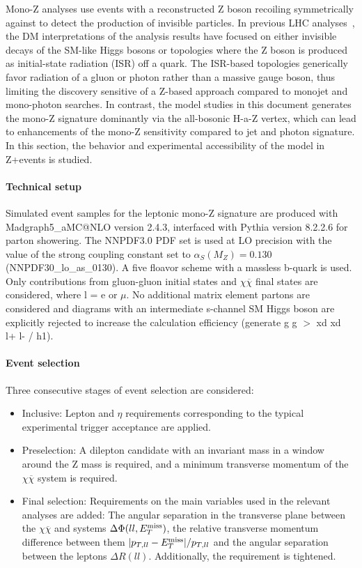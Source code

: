 Mono-Z analyses use events with a reconstructed Z boson recoiling symmetrically against \MET to detect the production of invisible particles.
In previous LHC analyses~\cite{Aaboud:2017bja,Sirunyan:2017qfc}, the DM interpretations of the analysis results have focused on either invisible decays of the SM-like Higgs bosons or topologies where the Z boson is produced as initial-state radiation (ISR) off a quark. The ISR-based topologies generically favor radiation of a gluon or photon rather than a massive gauge boson, thus limiting the discovery sensitive of a Z-based approach compared to monojet and mono-photon searches. In contrast, the model studies in this document generates the mono-Z signature dominantly via the all-bosonic H-a-Z vertex, which can lead to enhancements of the mono-Z sensitivity compared to jet and photon signature. In this section, the behavior and experimental accessibility of the model in Z+\MET events is studied.

\paragraph{Technical setup}
Simulated event samples for the leptonic mono-Z signature are produced with Madgraph5\_aMC@NLO version 2.4.3, interfaced with Pythia version 8.2.2.6 for parton showering. The NNPDF3.0 PDF set is used at LO precision with the value of the strong coupling constant set to $\alpha_{S}(M_{Z}) = 0.130$ (NNPDF30\_lo\_as\_0130). A five floavor scheme with a massless b-quark is used.  Only contributions from gluon-gluon initial states and \lp\lm$\chi\overline{\chi}$ final states are considered, where l = e or $\mu$. No additional matrix element partons are considered and diagrams with an intermediate s-channel SM Higgs boson are explicitly rejected to increase the calculation efficiency (generate g g $>$ xd xd~ l+ l- / h1). 


\paragraph{Event selection}
Three consecutive stages of event selection are considered:
\begin{itemize}
\item Inclusive: Lepton \pt and $\eta$ requirements corresponding to the typical experimental trigger acceptance are applied.

\item Preselection: A dilepton candidate with an invariant mass in a window around the Z mass is required, and a minimum transverse momentum of the $\chi\overline{\chi}$ system is required.

\item Final selection: Requirements on the main variables used in the relevant analyses are added: The angular separation in the transverse plane between the $\chi\overline{\chi}$ and \lp\lm systems $\Delta\Phi(ll,E_T^\mathrm{miss})$, the relative transverse momentum difference between them $|p_{T,ll} - E_T^\mathrm{miss}|/p_{T,ll}$ and the angular separation between the leptons $\Delta R(ll)$. Additionally, the \MET requirement is tightened.
\end{itemize}

